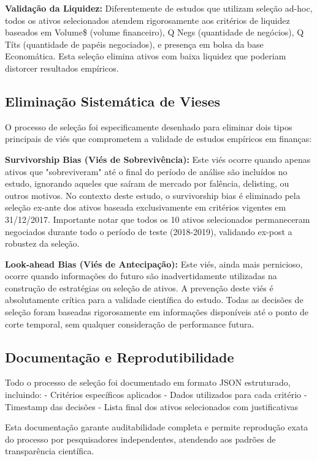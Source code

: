 \textbf{Validação da Liquidez:} Diferentemente de estudos que utilizam seleção ad-hoc, todos os ativos selecionados atendem rigorosamente aos critérios de liquidez baseados em Volume\$ (volume financeiro), Q Negs (quantidade de negócios), Q Títs (quantidade de papéis negociados), e presença em bolsa da base Economática. Esta seleção elimina ativos com baixa liquidez que poderiam distorcer resultados empíricos.

\subsection{Eliminação Sistemática de Vieses}

O processo de seleção foi especificamente desenhado para eliminar dois tipos principais de viés que comprometem a validade de estudos empíricos em finanças:

\textbf{Survivorship Bias (Viés de Sobrevivência):} Este viés ocorre quando apenas ativos que "sobreviveram" até o final do período de análise são incluídos no estudo, ignorando aqueles que saíram de mercado por falência, delisting, ou outros motivos. No contexto deste estudo, o survivorship bias é eliminado pela seleção ex-ante dos ativos baseada exclusivamente em critérios vigentes em 31/12/2017. Importante notar que todos os 10 ativos selecionados permaneceram negociados durante todo o período de teste (2018-2019), validando ex-post a robustez da seleção.

\textbf{Look-ahead Bias (Viés de Antecipação):} Este viés, ainda mais pernicioso, ocorre quando informações do futuro são inadvertidamente utilizadas na construção de estratégias ou seleção de ativos. A prevenção deste viés é absolutamente crítica para a validade científica do estudo. Todas as decisões de seleção foram baseadas rigorosamente em informações disponíveis até o ponto de corte temporal, sem qualquer consideração de performance futura.

\subsection{Documentação e Reprodutibilidade}

Todo o processo de seleção foi documentado em formato JSON estruturado, incluindo:
- Critérios específicos aplicados
- Dados utilizados para cada critério
- Timestamp das decisões
- Lista final dos ativos selecionados com justificativas

Esta documentação garante auditabilidade completa e permite reprodução exata do processo por pesquisadores independentes, atendendo aos padrões de transparência científica.

